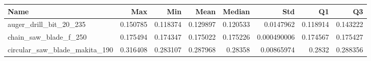 \begin{tabular}{lrrrrrrr}
\hline
 Name                          &      Max &      Min &     Mean &   Median &         Std &       Q1 &       Q3 \\
\hline
 auger\_drill\_bit\_20\_235        & 0.150785 & 0.118374 & 0.129897 & 0.120533 & 0.0147962   & 0.118914 & 0.143222 \\
 chain\_saw\_blade\_f\_250         & 0.175494 & 0.174347 & 0.175022 & 0.175226 & 0.000490006 & 0.174567 & 0.175427 \\
 circular\_saw\_blade\_makita\_190 & 0.316408 & 0.283107 & 0.287968 & 0.28358  & 0.00865974  & 0.2832   & 0.288356 \\
\hline
\end{tabular}